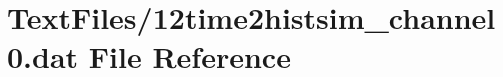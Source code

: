 \hypertarget{12time2histsim__channel0_8dat}{}\section{Text\+Files/12time2histsim\+\_\+channel0.dat File Reference}
\label{12time2histsim__channel0_8dat}
